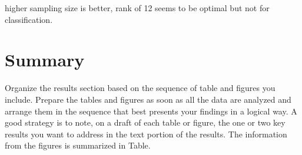 \documentclass[10pt,conference,compsocconf]{IEEEtran}
\begin{document}
    higher sampling size is better, rank of 12 seems to be optimal but not for classification.


    \section{Summary}

    Organize the results section based on the sequence of table and
    figures you include. Prepare the tables and figures as soon as all
    the data are analyzed and arrange them in the sequence that best
    presents your findings in a logical way. A good strategy is to note,
    on a draft of each table or figure, the one or two key results you
    want to address in the text portion of the results.
    The information from the figures is
    summarized in Table.




    \balance
    
    
\end{document}
